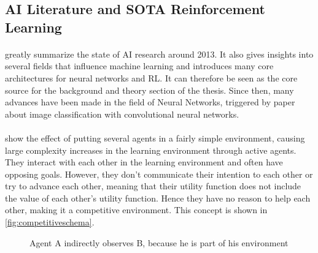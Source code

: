\documentclass[12pt,a4paper]{article}
\begin{document}



\subsection{\ac{AI} Literature and \ac{SOTA} Reinforcement Learning}

\paragraph{\citeauthor{russell2016artificial}}
greatly summarize the state of AI research around 2013. It also gives insights into several fields that influence machine learning and introduces many core architectures for neural networks and \ac{RL}. It can therefore be seen as the core source for the background and theory section of the thesis. Since then, many advances have been made in the field of Neural Networks, triggered by \citeauthor{krizhevsky2012imagenet} paper about image classification with convolutional neural networks.

\paragraph{\citeauthor{bansal2017emergent}}
show the effect of putting several agents in a fairly simple environment, causing large complexity increases in the learning environment through active agents. They interact with each other in the learning environment and often have opposing goals. However, they don't communicate their intention to each other or try to advance each other, meaning that their utility function does not include the value of each other's utility function. Hence they have no reason to help each other, making it a competitive environment. This concept is shown in \autoref{fig:competitiveschema}.

\begin{figure}[H]
    \centering
    \caption{Agent A indirectly observes B, because he is part of his environment}
    \label{fig:competitiveschema}
\end{figure}
\end{document}
